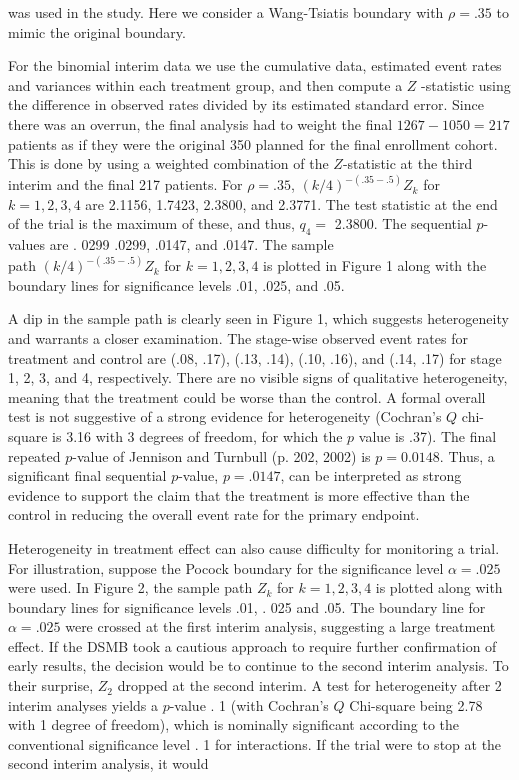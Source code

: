 \documentclass[10pt]{article}
\begin{document}
was used in the study. Here we consider a Wang-Tsiatis boundary with $\rho=.35$ to mimic the original boundary.

For the binomial interim data we use the cumulative data, estimated event rates and variances within each treatment group, and then compute a $Z$ -statistic using the difference in observed rates divided by its estimated standard error. Since there was an overrun, the final analysis had to weight the final $1267-1050=217$ patients as if they were the original 350 planned for the final enrollment cohort. This is done by using a weighted combination of the $Z$-statistic at the third interim and the final 217 patients. For $\rho=.35$, $(k / 4)^{-(.35-.5)} Z_{k}$ for $k=1,2,3,4$ are 2.1156, 1.7423, 2.3800, and 2.3771. The test statistic at the end of the trial is the maximum of these, and thus, $q_{4}=$ 2.3800. The sequential $p$-values are . 0299 .0299, .0147, and .0147. The sample\\
path $(k / 4)^{-(.35-.5)} Z_{k}$ for $k=1,2,3,4$ is plotted in Figure 1 along with the boundary lines for significance levels .01, .025, and .05.

A dip in the sample path is clearly seen in Figure 1, which suggests heterogeneity and warrants a closer examination. The stage-wise observed event rates for treatment and control are (.08, .17), (.13, .14), (.10, .16), and (.14, .17) for stage 1, 2, 3, and 4, respectively. There are no visible signs of qualitative heterogeneity, meaning that the treatment could be worse than the control. A formal overall test is not suggestive of a strong evidence for heterogeneity (Cochran's $Q$ chi-square is 3.16 with 3 degrees of freedom, for which the $p$ value is .37). The final repeated $p$-value of Jennison and Turnbull (p. 202, 2002) is $p=0.0148$. Thus, a significant final sequential $p$-value, $p=.0147$, can be interpreted as strong evidence to support the claim that the treatment is more effective than the control in reducing the overall event rate for the primary endpoint.

Heterogeneity in treatment effect can also cause difficulty for monitoring a trial. For illustration, suppose the Pocock boundary for the significance level $\alpha=.025$ were used. In Figure 2, the sample path $Z_{k}$ for $k=1,2,3,4$ is plotted along with boundary lines for significance levels .01, . 025 and .05. The boundary line for $\alpha=.025$ were crossed at the first interim analysis, suggesting a large treatment effect. If the DSMB took a cautious approach to require further confirmation of early results, the decision would be to continue to the second interim analysis. To their surprise, $Z_{2}$ dropped at the second interim. A test for heterogeneity after 2 interim analyses yields a $p$-value . 1 (with Cochran's $Q$ Chi-square being 2.78 with 1 degree of freedom), which is nominally significant according to the conventional significance level . 1 for interactions. If the trial were to stop at the second interim analysis, it would
\end{document}
